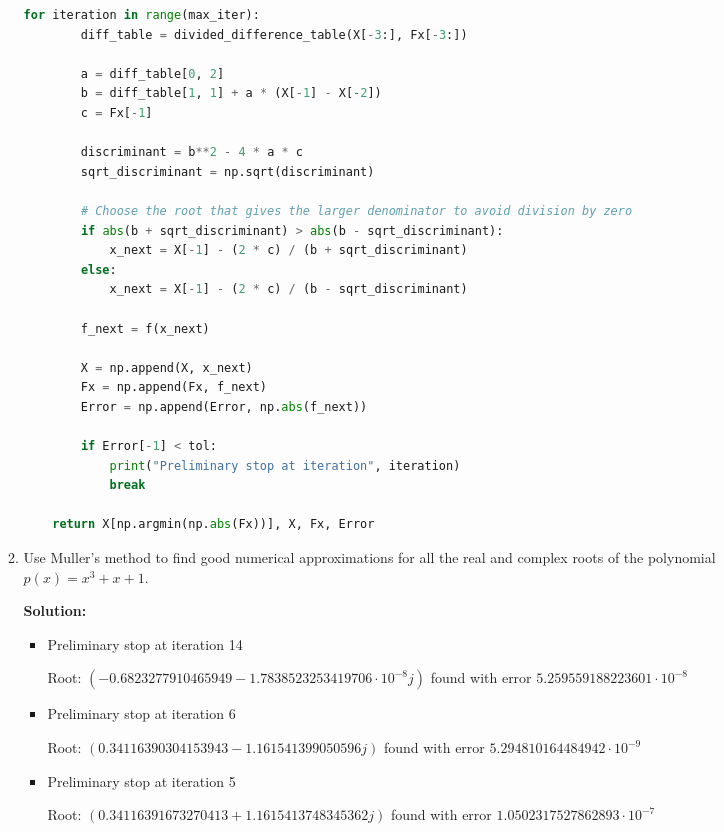 \documentclass[conference,onecolumn]{IEEEtran}
\begin{document}
\begin{enumerate}[label=\arabic{enumi}.]
\begin{enumerate}
\begin{lstlisting}[language=Python]
    for iteration in range(max_iter):
        diff_table = divided_difference_table(X[-3:], Fx[-3:])

        a = diff_table[0, 2]
        b = diff_table[1, 1] + a * (X[-1] - X[-2])
        c = Fx[-1]

        discriminant = b**2 - 4 * a * c
        sqrt_discriminant = np.sqrt(discriminant)

        # Choose the root that gives the larger denominator to avoid division by zero
        if abs(b + sqrt_discriminant) > abs(b - sqrt_discriminant):
            x_next = X[-1] - (2 * c) / (b + sqrt_discriminant)
        else:
            x_next = X[-1] - (2 * c) / (b - sqrt_discriminant)

        f_next = f(x_next)

        X = np.append(X, x_next)
        Fx = np.append(Fx, f_next)
        Error = np.append(Error, np.abs(f_next))

        if Error[-1] < tol:
            print("Preliminary stop at iteration", iteration)
            break

    return X[np.argmin(np.abs(Fx))], X, Fx, Error
                    \end{lstlisting}

              \item Use Muller's method to find good numerical approximations for all the real and complex roots of the polynomial $p(x) = x^3 + x + 1$.

                    \textbf{Solution:}

                    \begin{itemize}
                        \item Preliminary stop at iteration 14

                              Root: $(-0.6823277910465949-1.7838523253419706 \cdot 10^{-8}j)$ found with error $5.259559188223601 \cdot 10^{-8}$
                        \item Preliminary stop at iteration 6

                              Root: $(0.34116390304153943-1.161541399050596j)$ found with error $5.294810164484942 \cdot 10^{-9}$
                        \item Preliminary stop at iteration 5

                              Root: $(0.34116391673270413+1.1615413748345362j)$ found with error $1.0502317527862893 \cdot 10^{-7}$
                    \end{itemize}
          \end{enumerate}


\end{enumerate}
\end{document}
